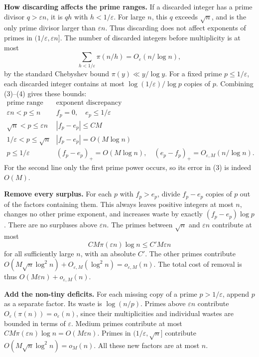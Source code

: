 \textbf{How discarding affects the prime ranges.} If a discarded integer has a prime divisor $q>\varepsilon n$, it is $qh$ with $h<1/\varepsilon$. For large $n$, this $q$ exceeds $\sqrt n$, and is the only prime divisor larger than $\varepsilon n$. Thus discarding does not affect exponents of primes in $(1/\varepsilon,\varepsilon n]$. The number of discarded integers before multiplicity is at most
\[
\sum_{h<1/\varepsilon}\pi(n/h)=O_\varepsilon(n/\log n),   \tag{4}
\]
by the standard Chebyshev bound $\pi(y)\ll y/\log y$. For a fixed prime $p\leq1/\varepsilon$, each discarded integer contains at most $\log(1/\varepsilon)/\log p$ copies of $p$. Combining (3)--(4) gives these bounds:
\[
\begin{array}{c|c}
\text{prime range}&\text{exponent discrepancy}\\\hline
\varepsilon n<p\leq n&f_p=0,\quad e_p\leq1/\varepsilon\\
\sqrt n<p\leq\varepsilon n&|f_p-e_p|\leq C M\\
1/\varepsilon<p\leq\sqrt n&|f_p-e_p|=O(M\log n)\\
p\leq1/\varepsilon&(f_p-e_p)_+=O(M\log n),\quad
(e_p-f_p)_+=O_{\varepsilon,M}(n/\log n).
\end{array}                                                       \tag{5}
\]
For the second line only the first prime power occurs, so its error in (3) is indeed $O(M)$.

\textbf{Remove every surplus.} For each $p$ with $f_p>e_p$, divide $f_p-e_p$ copies of $p$ out of the factors containing them. This always leaves positive integers at most $n$, changes no other prime exponent, and increases waste by exactly $(f_p-e_p)\log p$. There are no surpluses above $\varepsilon n$. The primes between $\sqrt n$ and $\varepsilon n$ contribute at most
\[
CM\pi(\varepsilon n)\log n\leq C' M\varepsilon n
\]
for all sufficiently large $n$, with an absolute $C'$. The other primes contribute $O(M\sqrt n\log^2 n)+O_{\varepsilon,M}(\log^2 n)=o_{\varepsilon,M}(n)$. The total cost of removal is thus $O(M\varepsilon n)+o_{\varepsilon,M}(n)$.

\textbf{Add the non-tiny deficits.} For each missing copy of a prime $p>1/\varepsilon$, append $p$ as a separate factor. Its waste is $\log(n/p)$. Primes above $\varepsilon n$ contribute $O_\varepsilon(\pi(n))=o_\varepsilon(n)$, since their multiplicities and individual wastes are bounded in terms of $\varepsilon$. Medium primes contribute at most $CM\pi(\varepsilon n)\log n=O(M\varepsilon n)$. Primes in $(1/\varepsilon,\sqrt n]$ contribute $O(M\sqrt n\log^2 n)=o_M(n)$. All these new factors are at most $n$.

